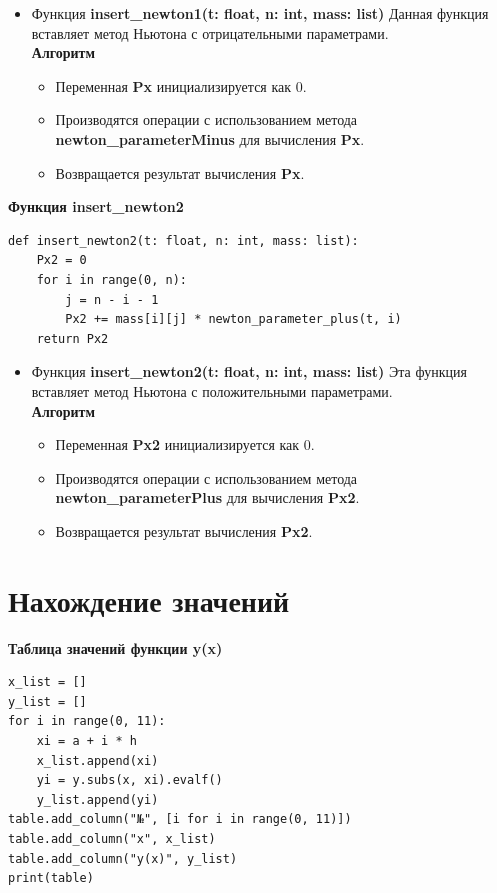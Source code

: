 \documentclass{article}
\begin{document}
\begin{itemize}
\item Функция \textbf{insert\_newton1(t: float, n: int, mass: list)} 
Данная функция вставляет метод Ньютона с отрицательными параметрами.\\
\textbf{Алгоритм}
\begin{itemize}
    \item Переменная \textbf{Px} инициализируется как 0.
    \item Производятся операции с использованием метода \textbf{newton\_parameterMinus} для вычисления \textbf{Px}.
    \item Возвращается результат вычисления \textbf{Px}.

\end{itemize}
\end{itemize}

\textbf{\large{Функция insert\_newton2}}
\begin{lstlisting}
def insert_newton2(t: float, n: int, mass: list):
    Px2 = 0
    for i in range(0, n):
        j = n - i - 1
        Px2 += mass[i][j] * newton_parameter_plus(t, i)
    return Px2
\end{lstlisting}

\begin{itemize}
\item Функция \textbf{insert\_newton2(t: float, n: int, mass: list)} 
Эта функция вставляет метод Ньютона с положительными параметрами.\\
\textbf{Алгоритм}
\begin{itemize}
    \item Переменная \textbf{Px2} инициализируется как 0.
    \item Производятся операции с использованием метода \textbf{newton\_parameterPlus} для вычисления \textbf{Px2}.
    \item Возвращается результат вычисления \textbf{Px2}.

\end{itemize}
\end{itemize}

\section{Нахождение значений}
\textbf{\large{Таблица значений функции y(x)}}

\begin{lstlisting}
x_list = []
y_list = []
for i in range(0, 11):
    xi = a + i * h
    x_list.append(xi)
    yi = y.subs(x, xi).evalf()
    y_list.append(yi)
table.add_column("№", [i for i in range(0, 11)])
table.add_column("x", x_list)
table.add_column("y(x)", y_list)
print(table)
\end{lstlisting}
\end{document}
